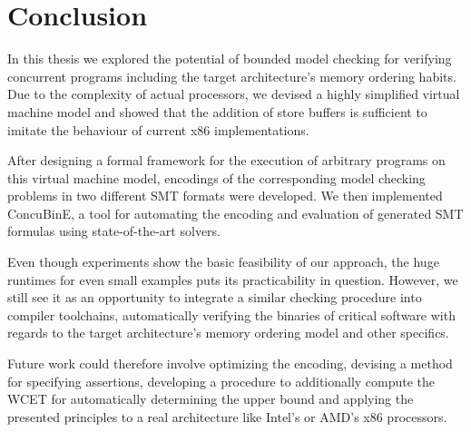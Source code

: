 \section{Conclusion}


In this thesis we explored the potential of bounded model checking for verifying concurrent programs
including the target architecture's memory ordering habits.
Due to the complexity of actual processors, we devised a highly simplified virtual machine model
and showed that the addition of store buffers is sufficient to imitate the behaviour of current x86 implementations.

After designing a formal framework for the execution of arbitrary programs on this virtual machine model,
encodings of the corresponding model checking problems in two different SMT formats were developed.
We then implemented ConcuBinE, a tool for automating the encoding and evaluation of generated SMT formulas using state-of-the-art solvers.

Even though experiments show the basic feasibility of our approach, the huge runtimes for even small examples puts its practicability in question.
However, we still see it as an opportunity to integrate a similar checking procedure into compiler toolchains, automatically verifying the binaries of critical software with regards to the target architecture's memory ordering model and other specifics.

Future work could therefore involve optimizing the encoding,
devising a method for specifying assertions,
developing a procedure to additionally compute the WCET for automatically determining the upper bound and applying the presented principles to a real architecture like Intel's or AMD's x86 processors.
